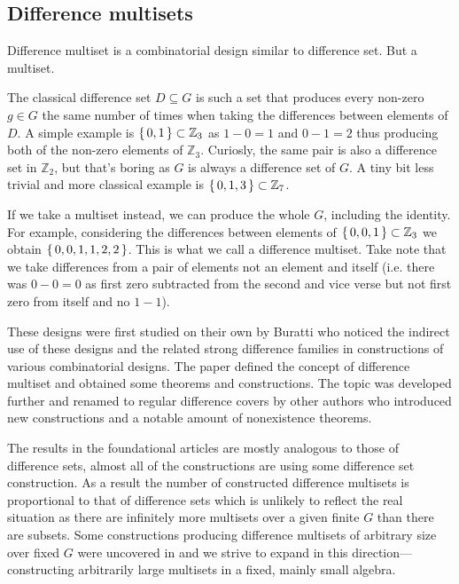 \subsection{Difference multisets}

    Difference multiset is a combinatorial design similar to difference set. But a multiset. 

    The classical difference set $D \subseteq G$ is such a set that produces every non-zero $g \in G$ the same number of times when taking the differences between elements of $D$. A simple example is $\set{0,1} \subset \mathbb Z_3$ as $1-0=1$ and $0-1=2$ thus producing both of the non-zero elements of $\mathbb Z_3$. Curiosly, the same pair is also a difference set in $\mathbb Z_2$, but that's boring as $G$ is always a difference set of $G$. A tiny bit less trivial and more classical example is $\set{0,1,3} \subset \mathbb Z_7$.

    If we take a multiset instead, we can produce the whole $G$, including the identity. For example, considering the differences between elements of $\set{0,0,1} \subset \mathbb Z_3$ we obtain $\set{0,0,1,1,2,2}$. This is what we call a difference multiset. Take note that we take differences from a pair of elements not an element and itself (i.e. there was $0-0=0$ as first zero subtracted from the second and vice verse but not first zero from itself and no $1-1$).

    These designs were first studied on their own by Buratti \cite{buratti1999old} who noticed the indirect use of these designs and the related strong difference families in constructions of various combinatorial designs. The paper defined the concept of difference multiset and obtained some theorems and constructions. The topic was developed further and renamed to regular difference covers by other authors \cite{arasu2005cyclic, arasu2005regular} who introduced new constructions and a notable amount of nonexistence theorems.

    The results in the foundational articles are mostly analogous to those of difference sets, almost all of the constructions are using some difference set construction. As a result the number of constructed difference multisets is proportional to that of difference sets which is unlikely to reflect the real situation as there are infinitely more multisets over a given finite $G$ than there are subsets. Some constructions producing difference multisets of arbitrary size over fixed $G$ were uncovered in \cite{momihara2009strong} and we strive to expand in this direction---constructing arbitrarily large multisets in a fixed, mainly small algebra.

